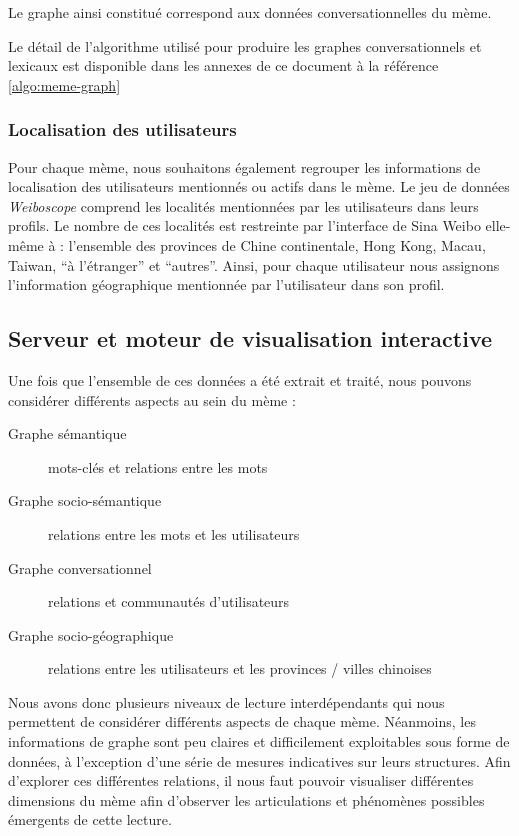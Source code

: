 Le graphe ainsi constitué correspond aux données conversationnelles
du mème.

Le détail de l'algorithme utilisé pour produire les graphes conversationnels et lexicaux est disponible dans les annexes de ce document à la référence \ref{algo:meme-graph}

\subsubsection{Localisation des utilisateurs}

Pour chaque mème, nous souhaitons également regrouper les
informations de localisation des utilisateurs mentionnés ou actifs
dans le mème. Le jeu de données \textit{Weiboscope }comprend les
localités mentionnées par les utilisateurs dans leurs profils. Le
nombre de ces localités est restreinte par
l{\textquoteright}interface de Sina Weibo elle-même à :
l{\textquoteright}ensemble des provinces de Chine continentale, Hong
Kong, Macau, Taiwan, {\textquotedblleft}à
l{\textquoteright}étranger{\textquotedblright} et
{\textquotedblleft}autres{\textquotedblright}. Ainsi, pour chaque
utilisateur nous assignons l{\textquoteright}information géographique
mentionnée par l{\textquoteright}utilisateur dans son profil.

\subsection{Serveur et moteur de visualisation interactive}

Une fois que l{\textquoteright}ensemble de ces données a été extrait et traité, nous pouvons considérer différents aspects au sein du mème :

\begin{description}
\item[Graphe sémantique] mots-clés et relations entre les mots
\item[Graphe socio-sémantique] relations entre les mots et les
utilisateurs
\item[Graphe conversationnel] relations et communautés
d{\textquoteright}utilisateurs 
\item[Graphe socio-géographique] relations entre les utilisateurs et
les provinces / villes chinoises
\end{description}

Nous avons donc plusieurs niveaux de lecture interdépendants qui nous permettent de considérer différents aspects de chaque mème. Néanmoins, les informations de graphe sont peu claires et difficilement exploitables sous forme de données, à l{\textquoteright}exception d{\textquoteright}une série de mesures indicatives sur leurs structures. Afin d{\textquoteright}explorer ces différentes relations, il nous faut pouvoir visualiser différentes dimensions du mème afin d{\textquoteright}observer les articulations et phénomènes possibles émergents de cette lecture. 

